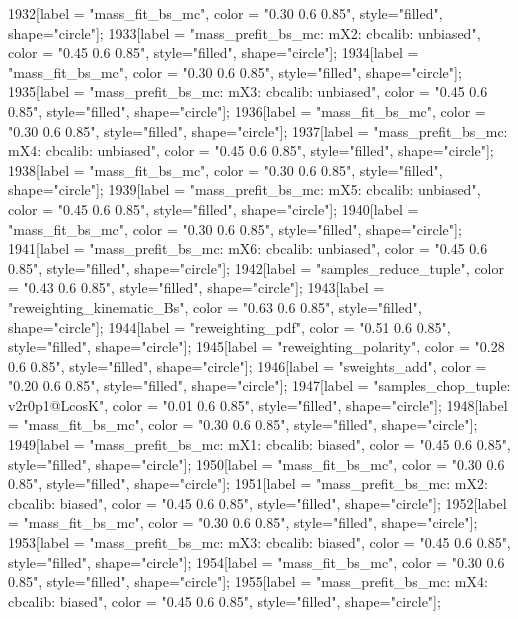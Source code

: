 {	1932[label = "mass_fit_bs_mc", color = "0.30 0.6 0.85", style="filled", shape="circle"];
	1933[label = "mass_prefit_bs_mc\nmassbin: mX2\nmassmodel: cbcalib\ntrigger: unbiased", color = "0.45 0.6 0.85", style="filled", shape="circle"];
	1934[label = "mass_fit_bs_mc", color = "0.30 0.6 0.85", style="filled", shape="circle"];
	1935[label = "mass_prefit_bs_mc\nmassbin: mX3\nmassmodel: cbcalib\ntrigger: unbiased", color = "0.45 0.6 0.85", style="filled", shape="circle"];
	1936[label = "mass_fit_bs_mc", color = "0.30 0.6 0.85", style="filled", shape="circle"];
	1937[label = "mass_prefit_bs_mc\nmassbin: mX4\nmassmodel: cbcalib\ntrigger: unbiased", color = "0.45 0.6 0.85", style="filled", shape="circle"];
	1938[label = "mass_fit_bs_mc", color = "0.30 0.6 0.85", style="filled", shape="circle"];
	1939[label = "mass_prefit_bs_mc\nmassbin: mX5\nmassmodel: cbcalib\ntrigger: unbiased", color = "0.45 0.6 0.85", style="filled", shape="circle"];
	1940[label = "mass_fit_bs_mc", color = "0.30 0.6 0.85", style="filled", shape="circle"];
	1941[label = "mass_prefit_bs_mc\nmassbin: mX6\nmassmodel: cbcalib\ntrigger: unbiased", color = "0.45 0.6 0.85", style="filled", shape="circle"];
	1942[label = "samples_reduce_tuple", color = "0.43 0.6 0.85", style="filled", shape="circle"];
	1943[label = "reweighting_kinematic_Bs", color = "0.63 0.6 0.85", style="filled", shape="circle"];
	1944[label = "reweighting_pdf", color = "0.51 0.6 0.85", style="filled", shape="circle"];
	1945[label = "reweighting_polarity", color = "0.28 0.6 0.85", style="filled", shape="circle"];
	1946[label = "sweights_add", color = "0.20 0.6 0.85", style="filled", shape="circle"];
	1947[label = "samples_chop_tuple\nversion: v2r0p1@LcosK", color = "0.01 0.6 0.85", style="filled", shape="circle"];
	1948[label = "mass_fit_bs_mc", color = "0.30 0.6 0.85", style="filled", shape="circle"];
	1949[label = "mass_prefit_bs_mc\nmassbin: mX1\nmassmodel: cbcalib\ntrigger: biased", color = "0.45 0.6 0.85", style="filled", shape="circle"];
	1950[label = "mass_fit_bs_mc", color = "0.30 0.6 0.85", style="filled", shape="circle"];
	1951[label = "mass_prefit_bs_mc\nmassbin: mX2\nmassmodel: cbcalib\ntrigger: biased", color = "0.45 0.6 0.85", style="filled", shape="circle"];
	1952[label = "mass_fit_bs_mc", color = "0.30 0.6 0.85", style="filled", shape="circle"];
	1953[label = "mass_prefit_bs_mc\nmassbin: mX3\nmassmodel: cbcalib\ntrigger: biased", color = "0.45 0.6 0.85", style="filled", shape="circle"];
	1954[label = "mass_fit_bs_mc", color = "0.30 0.6 0.85", style="filled", shape="circle"];
	1955[label = "mass_prefit_bs_mc\nmassbin: mX4\nmassmodel: cbcalib\ntrigger: biased", color = "0.45 0.6 0.85", style="filled", shape="circle"];
}
